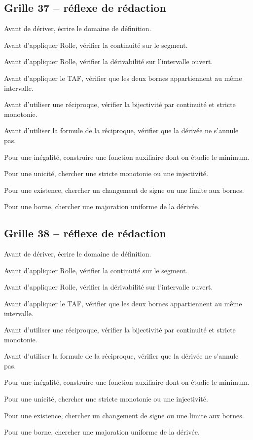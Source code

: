 \documentclass[11pt,a4paper]{article}
\begin{document}
\subsection*{Grille 37 -- réflexe de rédaction}

\begin{methodebox}

Avant de dériver, écrire le domaine de définition.

Avant d'appliquer Rolle, vérifier la continuité sur le segment.

Avant d'appliquer Rolle, vérifier la dérivabilité sur l'intervalle ouvert.

Avant d'appliquer le TAF, vérifier que les deux bornes appartiennent au même intervalle.

Avant d'utiliser une réciproque, vérifier la bijectivité par continuité et stricte monotonie.

Avant d'utiliser la formule de la réciproque, vérifier que la dérivée ne s'annule pas.

Pour une inégalité, construire une fonction auxiliaire dont on étudie le minimum.

Pour une unicité, chercher une stricte monotonie ou une injectivité.

Pour une existence, chercher un changement de signe ou une limite aux bornes.

Pour une borne, chercher une majoration uniforme de la dérivée.

\end{methodebox}

\subsection*{Grille 38 -- réflexe de rédaction}

\begin{methodebox}

Avant de dériver, écrire le domaine de définition.

Avant d'appliquer Rolle, vérifier la continuité sur le segment.

Avant d'appliquer Rolle, vérifier la dérivabilité sur l'intervalle ouvert.

Avant d'appliquer le TAF, vérifier que les deux bornes appartiennent au même intervalle.

Avant d'utiliser une réciproque, vérifier la bijectivité par continuité et stricte monotonie.

Avant d'utiliser la formule de la réciproque, vérifier que la dérivée ne s'annule pas.

Pour une inégalité, construire une fonction auxiliaire dont on étudie le minimum.

Pour une unicité, chercher une stricte monotonie ou une injectivité.

Pour une existence, chercher un changement de signe ou une limite aux bornes.

Pour une borne, chercher une majoration uniforme de la dérivée.

\end{methodebox}
\end{document}
